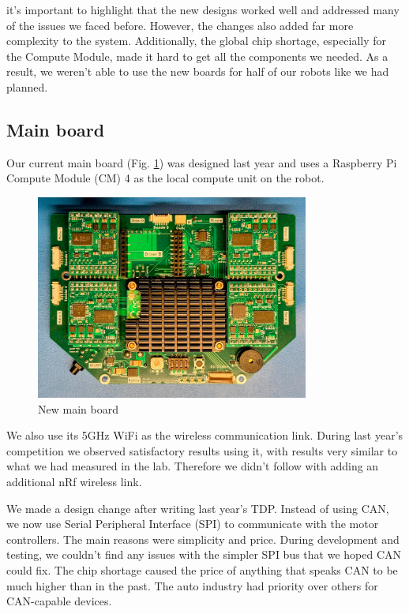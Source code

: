 \documentclass[runningheads]{llncs}
\begin{document}
it's important to highlight that the new designs worked well and addressed many of the issues we faced before. However, the changes also added far more complexity to the system. Additionally, the global chip shortage, especially for the Compute Module, made it hard to get all the components we needed. As a result, we weren't able to use the new boards for half of our robots like we had planned.

\subsection{Main board}

Our current main board (Fig. \ref{fig:main-board}) was designed last year and uses a Raspberry Pi Compute Module (CM) 4 as the local compute unit on the robot. 

\begin{figure}
	\centering
	\includegraphics[width=0.8\textwidth]{images/main-board.jpg}
	\caption{New main board}
	\label{fig:main-board}
\end{figure}

We also use its 5GHz WiFi as the wireless communication link. During last year's competition we observed satisfactory results using it, with results very similar to what we had measured in the lab. Therefore we didn't follow with adding an additional nRf wireless link.

We made a design change after writing last year's TDP. Instead of using CAN, we now use Serial Peripheral Interface (SPI) to communicate with the motor controllers. The main reasons were simplicity and price. During development and testing, we couldn't find any issues with the simpler SPI bus that we hoped CAN could fix. The chip shortage caused the price of anything that speaks CAN to be much higher than in the past. The auto industry had priority over others for CAN-capable devices.
\end{document}

